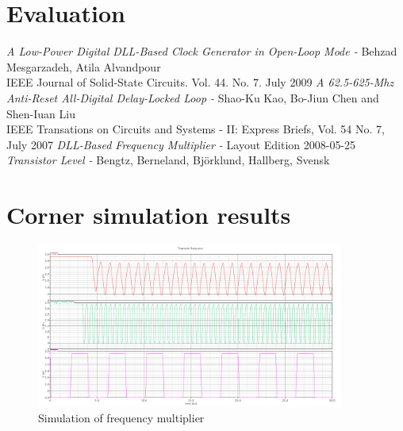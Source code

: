 \documentclass[a4paper,12pt]{article} \usepackage{graphicx}
\begin{document}
\section{Evaluation}


\newpage
\appendix 
\newpage

\begin{thebibliography}{99}
        \textit{A Low-Power Digital DLL-Based Clock Generator in Open-Loop Mode - }
                Behzad Mesgarzadeh, Atila Alvandpour \\
                IEEE Journal of Solid-State Circuits. Vol. 44. No. 7. July 2009
        \textit{A 62.5-625-Mhz Anti-Reset All-Digital Delay-Locked Loop - }
                Shao-Ku Kao, Bo-Jiun Chen and Shen-Iuan Liu \\
                IEEE Transations on Circuits and Systems - II: Express Briefs, Vol. 54 No. 7, July 2007
        \textit{DLL-Based Frequency Multiplier - }
                Layout Edition 2008-05-25 \\
        \textit{Transistor Level - }
                Bengtz, Berneland, Björklund, Hallberg, Svensk \\

\end{thebibliography}

\newpage
\section{Corner simulation results}
\label{sec:corners}

\begin{figure}[h]
        \centering
        \includegraphics[width=0.9\textwidth]{../Bilder/freq_mult_layout_sim.png}
        \caption{Simulation of frequency multiplier}
        \label{fig:freq_mult_sim}
\end{figure}
\end{document}
